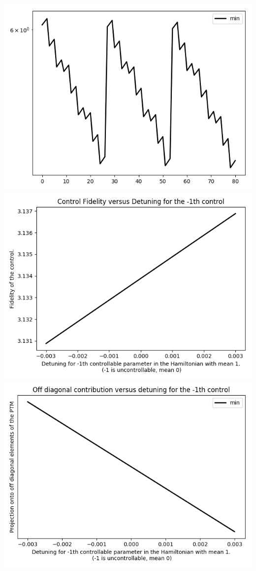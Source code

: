 \documentclass{article}
\begin{document}
\begin{center}
\includegraphics[scale=.9]{report_pickled_controls15/control_dpn_all}
\includegraphics[scale=.9]{control_fid_0}
\includegraphics[scale=.9]{off_diag_0}

\end{center}
\end{document}
